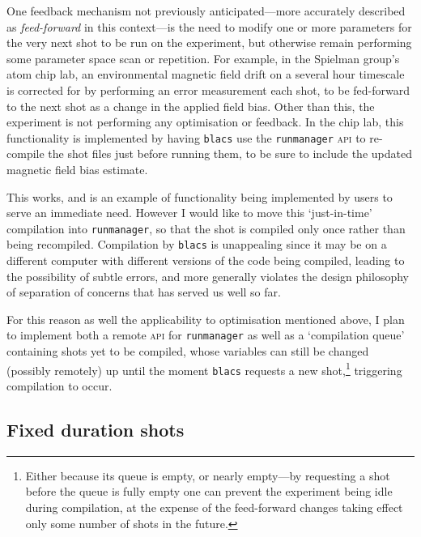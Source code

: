 One feedback mechanism not previously anticipated---more accurately described as \emph{feed-forward} in this context---is the need to modify one or more parameters for the very next shot to be run on the experiment, but otherwise remain performing some parameter space scan or repetition. For example, in the Spielman group's atom chip lab, an environmental magnetic field drift on a several hour timescale is corrected for by performing an error measurement each shot, to be fed-forward to the next shot as a change in the applied field bias. Other than this, the experiment is not performing any optimisation or feedback. In the chip lab, this functionality is implemented by having \texttt{blacs} use the \texttt{runmanager} \textsc{api} to re-compile the shot files just before running them, to be sure to include the updated magnetic field bias estimate. 

This works, and is an example of functionality being implemented by users to serve an immediate need. However I would like to move this `just-in-time' compilation into \texttt{runmanager}, so that the shot is compiled only once rather than being recompiled. Compilation by \texttt{blacs} is unappealing since it may be on a different computer with different versions of the code being compiled, leading to the possibility of subtle errors, and more generally violates the design philosophy of separation of concerns that has served us well so far. 

For this reason as well the applicability to optimisation mentioned above, I plan to implement both a remote \textsc{api} for \texttt{runmanager} as well as a `compilation queue' containing shots yet to be compiled, whose variables can still be changed (possibly remotely) up until the moment \texttt{blacs} requests a new shot,\footnote{Either because its queue is empty, or nearly empty---by requesting a shot before the queue is fully empty one can prevent the experiment being idle during compilation, at the expense of the feed-forward changes taking effect only some number of shots in the future.} triggering compilation to occur.

\subsection{Fixed duration shots}

